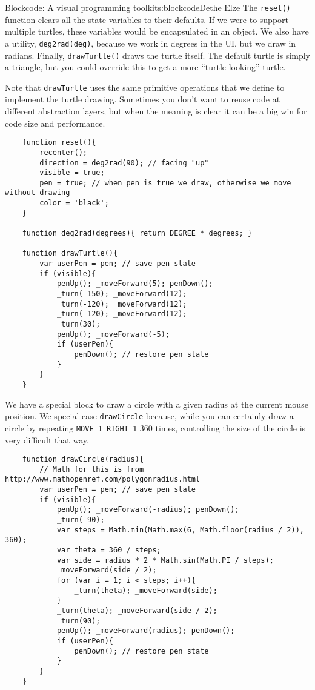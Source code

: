 \begin{aosachapter}{Blockcode: A visual programming toolkit}{s:blockcode}{Dethe Elze}
The \texttt{reset()} function clears all the state variables to their
defaults. If we were to support multiple turtles, these variables would
be encapsulated in an object. We also have a utility,
\texttt{deg2rad(deg)}, because we work in degrees in the UI, but we draw
in radians. Finally, \texttt{drawTurtle()} draws the turtle itself. The
default turtle is simply a triangle, but you could override this to get
a more ``turtle-looking'' turtle.

Note that \texttt{drawTurtle} uses the same primitive operations that we
define to implement the turtle drawing. Sometimes you don't want to
reuse code at different abstraction layers, but when the meaning is
clear it can be a big win for code size and performance.

\begin{verbatim}
    function reset(){
        recenter();
        direction = deg2rad(90); // facing "up"
        visible = true;
        pen = true; // when pen is true we draw, otherwise we move without drawing
        color = 'black';
    }

    function deg2rad(degrees){ return DEGREE * degrees; }

    function drawTurtle(){
        var userPen = pen; // save pen state
        if (visible){
            penUp(); _moveForward(5); penDown();
            _turn(-150); _moveForward(12);
            _turn(-120); _moveForward(12);
            _turn(-120); _moveForward(12);
            _turn(30);
            penUp(); _moveForward(-5);
            if (userPen){
                penDown(); // restore pen state
            }
        }
    }
\end{verbatim}

We have a special block to draw a circle with a given radius at the
current mouse position. We special-case \texttt{drawCircle} because,
while you can certainly draw a circle by repeating
\texttt{MOVE 1 RIGHT 1} 360 times, controlling the size of the circle is
very difficult that way.

\begin{verbatim}
    function drawCircle(radius){
        // Math for this is from http://www.mathopenref.com/polygonradius.html
        var userPen = pen; // save pen state
        if (visible){
            penUp(); _moveForward(-radius); penDown();
            _turn(-90);
            var steps = Math.min(Math.max(6, Math.floor(radius / 2)), 360);
            var theta = 360 / steps;
            var side = radius * 2 * Math.sin(Math.PI / steps);
            _moveForward(side / 2);
            for (var i = 1; i < steps; i++){
                _turn(theta); _moveForward(side);
            }
            _turn(theta); _moveForward(side / 2);
            _turn(90);
            penUp(); _moveForward(radius); penDown();
            if (userPen){
                penDown(); // restore pen state
            }
        }
    }
\end{verbatim}


\end{aosachapter}
